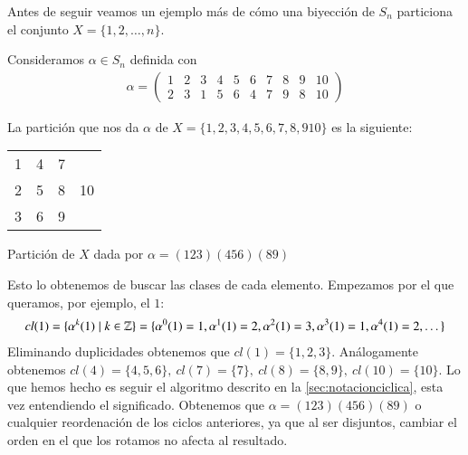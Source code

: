 \begin{ej}
	Antes de seguir veamos un ejemplo más de cómo una biyección de $S_n$ particiona el conjunto $X = \{1, 2, \dots, n\}$.
	
	Consideramos $\alpha \in S_n$ definida con
	\begin{align*}
		\alpha = \left(\begin{array}{cccccccccc}
		1 & 2 & 3 & 4 & 5 & 6 & 7 & 8 & 9 & 10 \\
		2 & 3 & 1 & 5 & 6 & 4 & 7 & 9 & 8 & 10
		\end{array}\right)
	\end{align*}
	
	La partición que nos da $\alpha$ de $X = \{1, 2, 3, 4, 5, 6, 7, 8, 9 10\}$ es la siguiente:
	\begin{center}
		\begin{tabular}{|c|c|c|c|}
			\hline
			1 & 4 & 7 & \\ \cline{3-3}
			2 & 5 & 8 & 10 \\
			3 & 6 & 9 & \\
			\hline
		\end{tabular}
	
		Partición de $X$ dada por $\alpha = (123)(456)(89)$
	\end{center}
	Esto lo obtenemos de buscar las clases de cada elemento. Empezamos por el que queramos, por ejemplo, el $1$:
	\begin{align*}
		cl(1) = \{\alpha^k(1) \mid k \in \mathbb{Z}\} = \{\alpha^0(1) = 1, \alpha^1(1) = 2, \alpha^2(1) = 3, \alpha^3(1) = 1, \alpha^4(1) = 2, \dots \}
	\end{align*}
	Eliminando duplicidades obtenemos que $cl(1) = \{1,2,3\}$. Análogamente obtenemos $cl(4) = \{4,5,6\},\ cl(7) = \{7\},\ cl(8) = \{8,9\},\ cl(10) = \{10\}$. Lo que hemos hecho es seguir el algoritmo descrito en la \autoref{sec:notacionciclica}, esta vez entendiendo el significado. Obtenemos que $\alpha = (123)(456)(89)$ o cualquier reordenación de los ciclos anteriores, ya que al ser disjuntos, cambiar el orden en el que los rotamos no afecta al resultado.
\end{ej}

